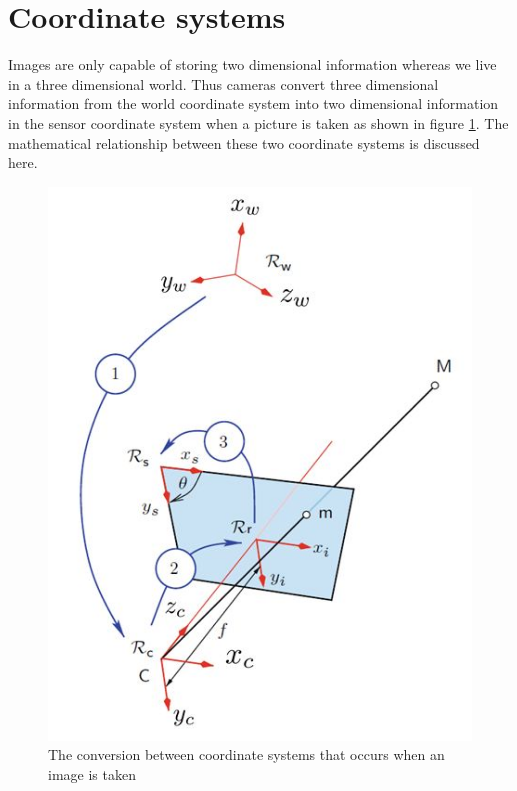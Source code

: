 \section{Coordinate systems}
\label{sec:coord sys}
Images are only capable of storing two dimensional information whereas we live in a three dimensional world. Thus cameras convert three dimensional information from the world coordinate system into two dimensional information in the sensor coordinate system when a picture is taken as shown in figure \ref{fig:coordsys}. The mathematical relationship between these two coordinate systems is discussed here.

\begin{figure}[h]
    \centering
    \includegraphics[scale=0.5]{CoordinateSystems}
    \caption{The conversion between coordinate systems that occurs when an image is taken}
    \label{fig:coordsys}
\end{figure}
